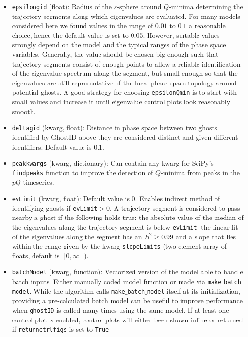 \documentclass{article}
\theoremstyle{definition}
\begin{document}
\begin{refsection}
\begin{itemize}
    \item {\tt epsilon\textunderscore gid} (float): Radius of the $\varepsilon$-sphere around $Q$-minima determining the trajectory segments along which eigenvalues are evaluated. For many models considered here we found values in the range of $0.01$ to $0.1$ a reasonable choice, hence the default value is set to $0.05$. However, suitable values strongly depend on the model and the typical ranges of the phase space variables. Generally, the value should be chosen big enough such that trajectory segments consist of enough points to allow a reliable identification of the eigenvalue spectrum along the segment, but small enough so that the eigenvalues are still representative of the local phase-space topology around potential ghosts. A good strategy for choosing {\tt epsilon\textunderscore Qmin} is to start with small values and increase it until eigenvalue control plots look reasonably smooth.
    \item {\tt delta\textunderscore gid} (kwarg, float): Distance in phase space between two ghosts identified by GhostID above they are considered distinct and given different identifiers. Default value is $0.1$.
    \item {\tt peak\textunderscore kwargs} (kwarg, dictionary): Can contain any kwarg for SciPy's {\tt find\textunderscore peaks} function to improve the detection of $Q$-minima from peaks in the $pQ$-timeseries.
    \item {\tt evLimit} (kwarg, float): Default value is 0. Enables indirect method of identifying ghosts if {\tt evLimit}$>0$. A trajectory segment is considered to pass nearby a ghost if the following holds true: the absolute value of the median of the eigenvalues along the trajectory segment is below {\tt evLimit}, the linear fit of the eigenvalues along the segment has an $R^2\geq0.99$ and a slope that lies within the range given by the kwarg {\tt slopeLimits} (two-element array of floats, default is $[0,\infty]$).
    \item {\tt batchModel} (kwarg, function): Vectorized version of the model able to handle batch inputs. Either manually coded model function or made via {\tt make$\_$batch$\_$model}. While the algorithm calls {\tt make$\_$batch$\_$model} itself at its initialization, providing a pre-calculated batch model can be useful to improve performance when {\tt ghostID} is called many times using the same model.
    If at least one control plot is enabled, control plots will either been shown inline or returned if {\tt return\textunderscore ctrl\textunderscore figs} is set to {\tt True}
\end{itemize}


\end{refsection}
\end{document}
